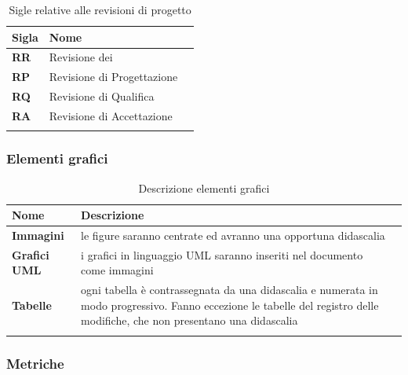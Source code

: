 {{		\setlength{\freewidth}{\dimexpr\textwidth-1\tabcolsep}
	\renewcommand{\arraystretch}{1.5}
	\setlength{\aboverulesep}{0pt}
	\setlength{\belowrulesep}{0pt}
	\begin{longtable}{L{.1\freewidth} L{.3\freewidth} L{.080\freewidth}}
		\textbf{Sigla} & \textbf{Nome} \\
		\toprule
		\endhead		
		 \textbf{RR}& Revisione dei  \\
		 \textbf{RP} & Revisione di Progettazione \\
		 \textbf{RQ} & Revisione di Qualifica \\
		 \textbf{RA} & Revisione di Accettazione \\
		 

		\bottomrule
		\hiderowcolors
		\caption{Sigle relative alle revisioni di progetto}
	\end{longtable}	
\subsubsection{Elementi grafici}

	\setlength{\freewidth}{\dimexpr\textwidth-1\tabcolsep}
	\renewcommand{\arraystretch}{1.5}
	\setlength{\aboverulesep}{0pt}
	\setlength{\belowrulesep}{0pt}
	\begin{longtable}{L{.2\freewidth} L{.6\freewidth} L{.080\freewidth}}
		\textbf{Nome} & \textbf{Descrizione} \\
		\toprule
		\endhead		
		 \textbf{Immagini} & le figure saranno centrate ed avranno una opportuna didascalia \\
		  \textbf{Grafici UML} & i grafici in linguaggio UML saranno inseriti nel documento come immagini \\
		  \textbf{Tabelle} & ogni tabella è contrassegnata da una didascalia e numerata in modo progressivo. Fanno eccezione le tabelle del registro delle modifiche, che non presentano una didascalia \\
		 

		\bottomrule
		\hiderowcolors
		\caption{Descrizione elementi grafici}
	\end{longtable}	

\subsubsection{Metriche}

}}
